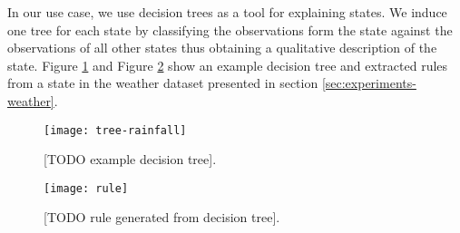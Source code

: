 In our use case, we use decision trees as a tool for explaining states. We induce one tree for each
state by classifying the observations form the state against the observations of all other states
thus obtaining a qualitative description of the state. Figure \ref{fig:example-decision-tree} and
Figure \ref{fig:example-decision-tree-rule} show an example decision tree and extracted rules
from a state in the weather dataset presented in section \ref{sec:experiments-weather}.

\begin{figure}[h!]
	\centering
	\texttt{[image: tree-rainfall]}
	\caption{[TODO example decision tree].}
	\label{fig:example-decision-tree}
\end{figure}

\begin{figure}[h!]
	\centering
	\texttt{[image: rule]}
	\caption{[TODO rule generated from decision tree].}
	\label{fig:example-decision-tree-rule}
\end{figure}